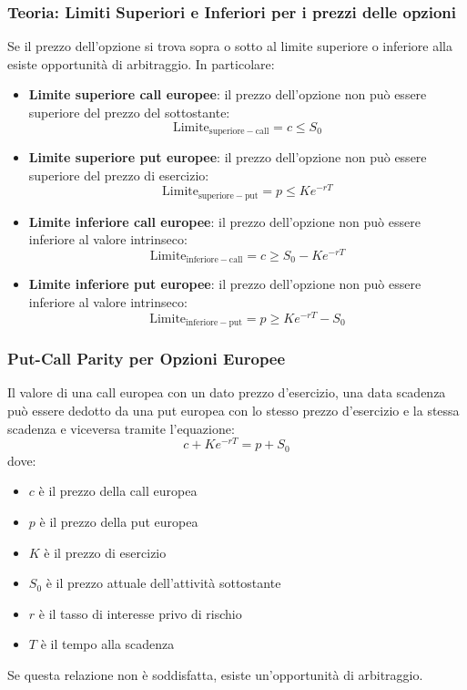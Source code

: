 \documentclass[12pt,a4paper]{report}
\begin{document}
\newpage
\subsubsection{Teoria: Limiti Superiori e Inferiori per i prezzi delle opzioni}

Se il prezzo dell'opzione si trova sopra o sotto al limite superiore o inferiore alla esiste opportunità di arbitraggio. In particolare:


\begin{itemize}
    \item \textbf{Limite superiore call europee}: il prezzo dell'opzione non può essere superiore del prezzo del sottostante:
    \[
    \mathrm{Limite}_{\mathrm{superiore-call}} = c \leq S_0
    \]

\item \textbf{Limite superiore put europee}: il prezzo dell'opzione non può essere superiore del prezzo di esercizio:
    \[
    \mathrm{Limite}_{\mathrm{superiore-put}} = p \leq Ke^{-rT}
    \]
\item \textbf{Limite inferiore call europee}: il prezzo dell'opzione non può essere inferiore al valore intrinseco:
    \[
    \mathrm{Limite}_{\mathrm{inferiore-call}} = c \geq S_0 - Ke^{-rT}
    \]

\item \textbf{Limite inferiore put europee}: il prezzo dell'opzione non può essere inferiore al valore intrinseco:
    \[
    \mathrm{Limite}_{\mathrm{inferiore-put}} = p \geq Ke^{-rT} - S_0
    \]
\end{itemize}
\subsubsection{Put-Call Parity per Opzioni Europee}
Il valore di una call europea con un dato prezzo d'esercizio, una data scadenza può essere dedotto da una put europea con lo stesso prezzo d'esercizio e la stessa scadenza e viceversa tramite l'equazione:
\[
c + K e^{-rT} = p + S_0
\]
dove:
\begin{itemize}
    \item \(c\) è il prezzo della call europea
    \item \(p\) è il prezzo della put europea
    \item \(K\) è il prezzo di esercizio
    \item \(S_0\) è il prezzo attuale dell'attività sottostante
    \item \(r\) è il tasso di interesse privo di rischio
    \item \(T\) è il tempo alla scadenza
\end{itemize}
Se questa relazione non è soddisfatta, esiste un'opportunità di arbitraggio.
\newpage
\end{document}
